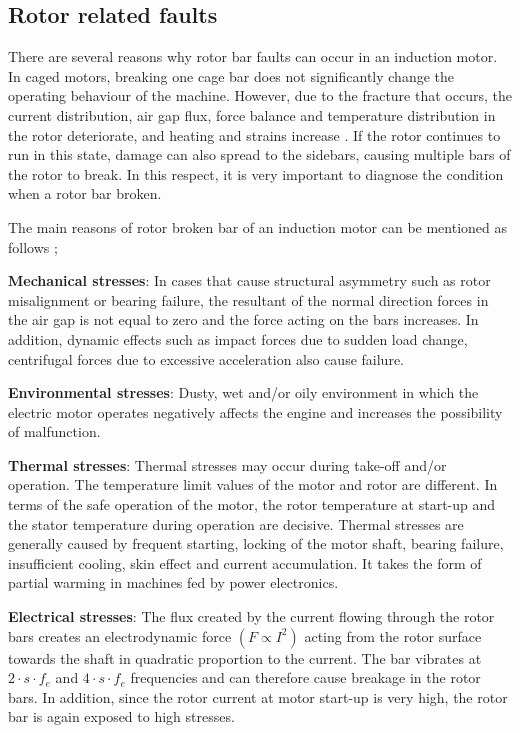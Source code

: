 \subsection{Rotor related faults}

There are several reasons why rotor bar faults can occur in an induction motor. In caged motors, breaking one cage bar does not significantly change the operating behaviour of the machine. However, due to the fracture that occurs, the current distribution, air gap flux, force balance and temperature distribution in the rotor deteriorate, and heating and strains increase \cite{imeryuz2009asenkron}. If the rotor continues to run in this state, damage can also spread to the sidebars, causing multiple bars of the rotor to break. In this respect, it is very important to diagnose the condition when a rotor bar broken.

The main reasons of rotor broken bar of an induction motor can be mentioned as follows \cite{imeryuz2009asenkron,filippetti2013condition,bonnett1999root,Siddique};

\textbf{Mechanical stresses}: In cases that cause structural asymmetry such as rotor misalignment or bearing failure, the resultant of the normal direction forces in the air gap is not equal to zero and the force acting on the bars increases. In addition, dynamic effects such as impact forces due to sudden load change, centrifugal forces due to excessive acceleration also cause failure.

\textbf{Environmental stresses}: Dusty, wet and/or oily environment in which the electric motor operates negatively affects the engine and increases the possibility of malfunction.

\textbf{Thermal stresses}: Thermal stresses may occur during take-off and/or operation. The temperature limit values of the motor and rotor are different. In terms of the safe operation of the motor, the rotor temperature at start-up and the stator temperature during operation are decisive. Thermal stresses are generally caused by frequent starting, locking of the motor shaft, bearing failure, insufficient cooling, skin effect and current accumulation. It takes the form of partial warming in machines fed by power electronics.

\textbf{Electrical stresses}: The flux created by the current flowing through the rotor bars creates an electrodynamic force $(F \propto I^2)$ acting from the rotor surface towards the shaft in quadratic proportion to the current. The bar vibrates at $2\cdot s\cdot f_{e}$ and $4\cdot s\cdot f_{e}$  frequencies and can therefore cause breakage in the rotor bars. In addition, since the rotor current at motor start-up is very high, the rotor bar is again exposed to high stresses.

